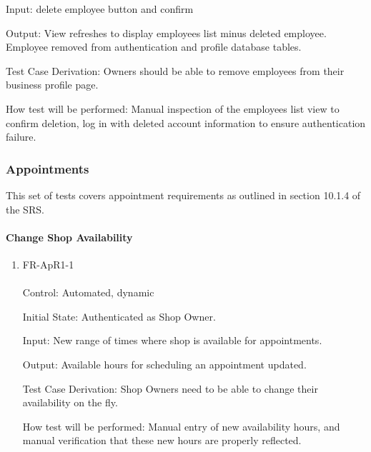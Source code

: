 \documentclass[12pt, titlepage]{article}
\begin{document}
\begin{enumerate}
Input: delete employee button and confirm

Output: View refreshes to display employees list minus deleted employee. Employee removed from authentication and profile database tables.

Test Case Derivation: Owners should be able to remove employees from their business profile page.
					
How test will be performed: Manual inspection of the employees list view to confirm deletion, log in with deleted account information to ensure authentication failure.

\end{enumerate}

\subsubsection{Appointments}

    This set of tests covers appointment requirements as outlined in section 10.1.4 of the SRS.

    \paragraph{Change Shop Availability}
        \begin{enumerate}
            \item{FR-ApR1-1} \\ \\
                Control: Automated, dynamic \par
                Initial State: Authenticated as Shop Owner. \par
                Input: New range of times where shop is available for appointments. \par
                Output: Available hours for scheduling an appointment updated. \par
                Test Case Derivation: Shop Owners need to be able to change their availability on the fly. \par
                How test will be performed: Manual entry of new availability hours, and manual verification that these new hours are properly reflected. \par
        \end{enumerate}
\end{document}
